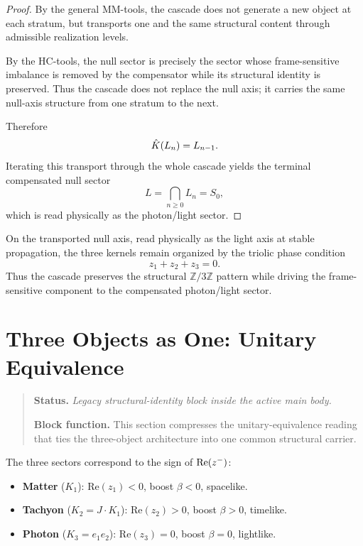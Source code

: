 \begin{proof}
By the general MM-tools, the cascade does not generate a new object at
each stratum, but transports one and the same structural content through
admissible realization levels.

By the HC-tools, the null sector is precisely the sector whose
frame-sensitive imbalance is removed by the compensator while its
structural identity is preserved.
Thus the cascade does not replace the null axis; it carries the same
null-axis structure from one stratum to the next.

Therefore
\[
\hat{K}(L_n)=L_{n-1}.
\]
Iterating this transport through the whole cascade yields the terminal
compensated null sector
\[
L=\bigcap_{n\ge 0}L_n=S_0,
\]
which is read physically as the photon/light sector.
\end{proof}

\begin{remark}
On the transported null axis, read physically as the light axis at stable propagation, the three kernels remain organized by the
triolic phase condition
\[
z_1+z_2+z_3=0.
\]
Thus the cascade preserves the structural $\mathbb{Z}/3\mathbb{Z}$
pattern while driving the frame-sensitive component to the compensated
photon/light sector.
\end{remark}


\section{Three Objects as One: Unitary Equivalence}
\begin{quote}\small
\noindent\textbf{Status.} \emph{Legacy structural-identity block inside the active main body.}\par
\noindent\textbf{Block function.} This section compresses the unitary-equivalence reading that ties the three-object architecture into one common structural carrier.
\end{quote}
\label{sec:unitary}

\begin{definition}
The three sectors correspond to the sign of $\mathrm{Re}(z^-)$:
\begin{itemize}
  \item \textbf{Matter} ($K_1$): $\mathrm{Re}(z_1)<0$, boost $\beta<0$, spacelike.
  \item \textbf{Tachyon} ($K_2=J\cdot K_1$): $\mathrm{Re}(z_2)>0$, boost $\beta>0$, timelike.
  \item \textbf{Photon} ($K_3=e_1 e_2$): $\mathrm{Re}(z_3)=0$, boost $\beta=0$, lightlike.
\end{itemize}
\end{definition}

